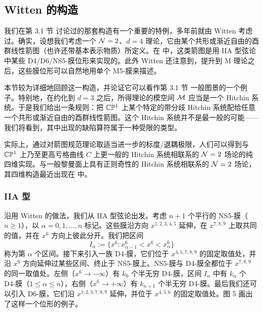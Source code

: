 
\subsection{Witten 的构造}
\label{subsec:WittenConstruction}

我们在第 3.1 节%
讨论过的那套构造有一个重要的特例，多年前就由 Witten 考虑过\cite{Witten:1997sc}。确实，设想我们考虑一个 $\mathcal{N}=2$、$d=4$ 理论，它由某个共形或渐近自由的酉群线性箭图（也许还带基本表示物质）所定义。在 \cite{Witten:1997sc} 中，这类箭图是用 IIA 型弦论中某些 D4/D6/NS5-膜位形来实现的。此外 Witten 还注意到，提升到 M 理论之后，这些膜位形可以自然地用单个 M5-膜来描述。

本节较为详细地回顾这一构造，并论证它可以看作第 3.1 节%
一般图景的一个例子。特别地，在约化到 $d=3$ 之后，所得理论的模空间 $\mathcal{M}$ 应当是一个 Hitchin 系统。于是我们给出一条规则：把 $\mathbb{C}\mathbb{P}^1$ 上某个特定的带分歧 Hitchin 系统配给任意一个共形或渐近自由的酉群线性箭图。这个 Hitchin 系统并不是最一般的可能——我们将看到，其中出现的缺陷算符属于一种受限的类型。

实际上，通过对箭图规范理论取适当进一步的标度/退耦极限，人们可以得到与 $\mathbb{C}\mathbb{P}^1$ 上乃至更高亏格曲线 $C$ 上更一般的 Hitchin 系统相联系的 $\mathcal{N}=2$ 场论的纯四维实现。与一般黎曼面上具有正则奇性的 Hitchin 系统相联系的 $\mathcal{N}=2$ 场论，其四维构造最近出现在 \cite{Gaiotto:2009we} 中。

\subsubsection{IIA 型}

沿用 Witten 的做法，我们从 IIA 型弦论出发。考虑 $n+1$ 个平行的 NS5-膜（$n\geq 1$），以 $\alpha = 0, 1, \dots, n$ 标记。这些膜沿方向 $x^{1,2,3,4,5}$ 延伸，在 $x^{7,8,9}$ 上取共同的值，并在 $x^6$ 方向上彼此分开。我们把区间
\begin{equation}
\label{eq:IIA-intervals}
I_\alpha := \{ x^6: x^6_{\alpha-1} < x^6 < x^6_{\alpha} \}
\end{equation}
称为第 $\alpha$ 个区间。接下来引入一族 D4-膜，它们位于 $x^{4,5,7,8,9}$ 的固定取值处，并沿 $x^6$ 方向延伸过某些区间、终止于 NS5-膜上。NS5-膜与 D4-膜全都位于 $x^{7,8,9}$ 的同一取值处。左侧（$x^6 \to -\infty$）有 $k_0$ 个半无穷 D4-膜，区间 $I_\alpha$ 中有 $k_\alpha$ 个 D4-膜（$1 \leq \alpha\leq n$），右侧（$x^6 \to +\infty$）有 $k_{n+1}$ 个半无穷 D4-膜。最后我们还可以引入 D6-膜，它们沿 $x^{1,2,3,7,8,9}$ 延伸，并位于 $x^{4,5,6}$ 的固定取值处。图 5%
画出了这样一个位形的例子。

